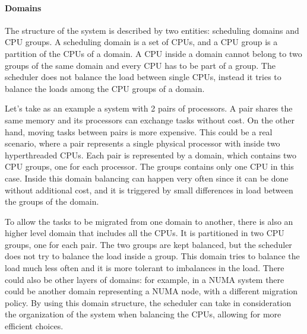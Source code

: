 \paragraph{Domains} %
The structure of the system is described by two entities: scheduling domains and CPU groups. A scheduling domain is a set of CPUs, and a CPU group is a partition of the CPUs of a domain. A CPU inside a domain cannot belong to two groups of the same domain and every CPU has to be part of a group. The scheduler does not balance the load between single CPUs, instead it tries to balance the loads among the CPU groups of a domain.

Let's take as an example a system with 2 pairs of processors. A pair shares the same memory and its processors can exchange tasks without cost. On the other hand, moving tasks between pairs is more expensive. This could be a real scenario, where a pair represents a single physical processor with inside two hyperthreaded CPUs. Each pair is represented by a domain, which contains two CPU groups, one for each processor. The groups contains only one CPU in this case. Inside this domain balancing can happen very often since it can be done without additional cost, and it is triggered by small differences in load between the groups of the domain.

To allow the tasks to be migrated from one domain to another, there is also an higher level domain that includes all the CPUs. It is partitioned in two CPU groups, one for each pair. The two groups are kept balanced, but the scheduler does not try to balance the load inside a group. This domain tries to balance the load much less often and it is more tolerant to imbalances in the load. There could also be other layers of domains: for example, in a NUMA system there could be another domain representing a NUMA node, with a different migration policy. By using this domain structure, the scheduler can take in consideration the organization of the system when balancing the CPUs, allowing for more efficient choices.